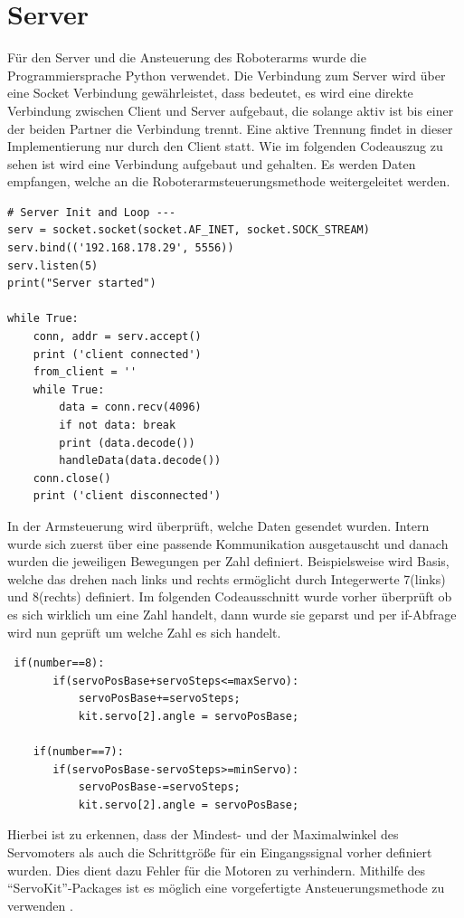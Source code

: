 \documentclass[12pt,					%
							 oneside,			%
							 a4paper,			%
							 halfparskip,		%
							 liststotoc,			%
							 bibtotoc,			%
							 fleqn,				%
							 pointlessnumbers]	%
							 {scrreprt}
\begin{document}
\section{Server}
Für den Server und die Ansteuerung des Roboterarms wurde die Programmiersprache Python verwendet\cite{PiHandbuch}. Die Verbindung zum Server wird über eine Socket Verbindung gewährleistet, dass bedeutet, es wird eine direkte Verbindung zwischen Client und Server aufgebaut, die solange aktiv ist bis einer der beiden Partner die Verbindung trennt. Eine aktive Trennung findet in dieser Implementierung nur durch den Client statt. Wie im folgenden Codeauszug zu sehen ist wird eine Verbindung aufgebaut und gehalten. Es werden Daten empfangen, welche an die Roboterarmsteuerungsmethode weitergeleitet werden.
\begin{lstlisting}
# Server Init and Loop ---
serv = socket.socket(socket.AF_INET, socket.SOCK_STREAM)
serv.bind(('192.168.178.29', 5556))
serv.listen(5)
print("Server started")

while True:
    conn, addr = serv.accept()
    print ('client connected')
    from_client = ''
    while True:
        data = conn.recv(4096)
        if not data: break
        print (data.decode())
        handleData(data.decode())
    conn.close()
    print ('client disconnected')
\end{lstlisting}


In der Armsteuerung wird überprüft, welche Daten gesendet wurden. Intern wurde sich zuerst über eine passende Kommunikation ausgetauscht und danach wurden die jeweiligen Bewegungen per Zahl definiert. Beispielsweise wird Basis, welche das drehen nach links und rechts ermöglicht durch Integerwerte 7(links) und 8(rechts) definiert. Im folgenden Codeausschnitt wurde vorher überprüft ob es sich wirklich um eine Zahl handelt, dann wurde sie geparst und per \glqq{}if\grqq{}-Abfrage wird nun geprüft um welche Zahl es sich handelt. 
\newpage
\begin{lstlisting}
 if(number==8):
       if(servoPosBase+servoSteps<=maxServo):           
           servoPosBase+=servoSteps;
           kit.servo[2].angle = servoPosBase;
        
    if(number==7):
       if(servoPosBase-servoSteps>=minServo):           
           servoPosBase-=servoSteps;
           kit.servo[2].angle = servoPosBase;
\end{lstlisting}
Hierbei ist zu erkennen, dass der Mindest- und der Maximalwinkel des Servomoters als auch die Schrittgröße für ein Eingangssignal vorher definiert wurden. Dies dient dazu Fehler für die Motoren zu verhindern.  Mithilfe des ``ServoKit''-Packages ist es möglich eine vorgefertigte Ansteuerungsmethode zu verwenden \cite{Foundation2020}.
\end{document}
